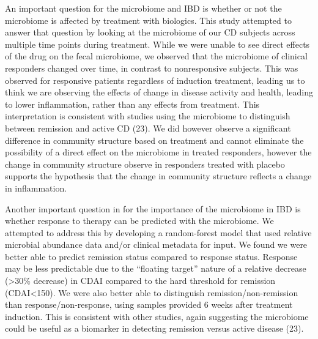 \documentclass[11pt,]{article}
\begin{document}
An important question for the microbiome and IBD is whether or not the
microbiome is affected by treatment with biologics. This study attempted
to answer that question by looking at the microbiome of our CD subjects
across multiple time points during treatment. While we were unable to
see direct effects of the drug on the fecal microbiome, we observed that
the microbiome of clinical responders changed over time, in contrast to
nonresponsive subjects. This was observed for responsive patients
regardless of induction treatment, leading us to think we are observing
the effects of change in disease activity and health, leading to lower
inflammation, rather than any effects from treatment. This
interpretation is consistent with studies using the microbiome to
distinguish between remission and active CD (23). We did however observe
a significant difference in community structure based on treatment and
cannot eliminate the possibility of a direct effect on the microbiome in
treated responders, however the change in community structure observe in
responders treated with placebo supports the hypothesis that the change
in community structure reflects a change in inflammation.

Another important question in for the importance of the microbiome in
IBD is whether response to therapy can be predicted with the microbiome.
We attempted to address this by developing a random-forest model that
used relative microbial abundance data and/or clinical metadata for
input. We found we were better able to predict remission status compared
to response status. Response may be less predictable due to the
``floating target'' nature of a relative decrease (\textgreater{}30\%
decrease) in CDAI compared to the hard threshold for remission
(CDAI\textless{}150). We were also better able to distinguish
remission/non-remission than response/non-response, using samples
provided 6 weeks after treatment induction. This is consistent with
other studies, again suggesting the microbiome could be useful as a
biomarker in detecting remission versus active disease (23).
\end{document}
